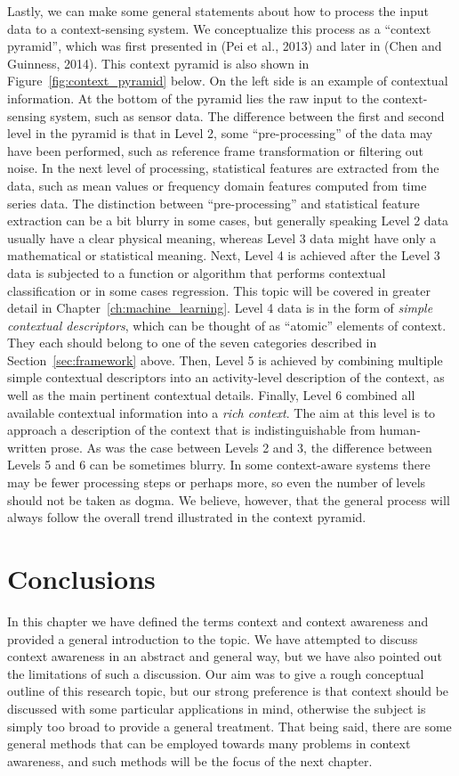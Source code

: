Lastly, we can make some general statements about how to process the input data to a context-sensing system. We conceptualize this process as a ``context pyramid'', which was first presented in (Pei et al., 2013) and later in (Chen and Guinness, 2014). This context pyramid is also shown in Figure~\ref{fig:context_pyramid} below. On the left side is an example of contextual information. At the bottom of the pyramid lies the raw input to the context-sensing system, such as sensor data. The difference between the first and second level in the pyramid is that in Level 2, some ``pre-processing'' of the data may have been performed, such as reference frame transformation or filtering out noise. In the next level of processing, statistical features are extracted from the data, such as mean values or frequency domain features computed from time series data. The distinction between ``pre-processing'' and statistical feature extraction can be a bit blurry in some cases, but generally speaking Level 2 data usually have a clear physical meaning, whereas Level 3 data might have only a mathematical or statistical meaning. Next, Level 4 is achieved after the Level 3 data is subjected to a function or algorithm that performs contextual classification or in some cases regression. This topic will be covered in greater detail in Chapter~\ref{ch:machine_learning}. Level 4 data is in the form of \emph{simple contextual descriptors}, which can be thought of as ``atomic'' elements of context. They each should belong to one of the seven categories described in Section~\ref{sec:framework} above. Then, Level 5 is achieved by combining multiple simple contextual descriptors into an activity-level description of the context, as well as the main pertinent contextual details. Finally, Level 6 combined all available contextual information into a \emph{rich context}. The aim at this level is to approach a description of the context that is indistinguishable from human-written prose. As was the case between Levels 2 and 3, the difference between Levels 5 and 6 can be sometimes blurry. In some context-aware systems there may be fewer processing steps or perhaps more, so even the number of levels should not be taken as dogma. We believe, however, that the general process will always follow the overall trend illustrated in the context pyramid.
%
\section{Conclusions}
\label{sec:conclusions}
%
In this chapter we have defined the terms context and context awareness and provided a general introduction to the topic. We have attempted to discuss context awareness in an abstract and general way, but we have also pointed out the limitations of such a discussion. Our aim was to give a rough conceptual outline of this research topic, but our strong preference is that context should be discussed with some particular applications in mind, otherwise the subject is simply too broad to provide a general treatment. That being said, there are some general methods that can be employed towards many problems in context awareness, and such methods will be the focus of the next chapter.